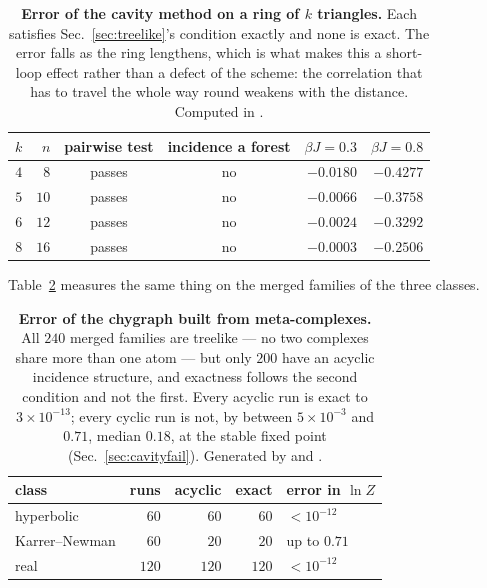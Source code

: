 \begin{table}[t]
\centering\small
\begin{tabular}{rrccrr}
\hline\hline
$k$ & $n$ & pairwise test & incidence a forest &
  $\beta J=0.3$ & $\beta J=0.8$\\
\hline
$4$ & $8$ & passes & no & $-0.0180$ & $-0.4277$\\
$5$ & $10$ & passes & no & $-0.0066$ & $-0.3758$\\
$6$ & $12$ & passes & no & $-0.0024$ & $-0.3292$\\
$8$ & $16$ & passes & no & $-0.0003$ & $-0.2506$\\
\hline\hline
\end{tabular}
\caption{\textbf{Error of the cavity method on a ring of $k$ triangles.} Each
satisfies Sec.~\ref{sec:treelike}'s condition exactly and none is exact. The
error falls as the ring lengthens, which is what makes this a short-loop effect
rather than a defect of the scheme: the correlation that has to travel the whole
way round weakens with the distance. Computed in
.}
\label{tab:ring}
\end{table}

Table~\ref{tab:mergeerr} measures the same thing on the merged families of the
three classes.

\begin{table}[t]
\centering\small
\begin{tabular}{lrrrl}
\hline\hline
class & runs & acyclic & exact & error in $\ln Z$\\
\hline
hyperbolic & $60$ & $60$ & $60$ & $<10^{-12}$\\
Karrer--Newman & $60$ & $20$ & $20$ & up to $0.71$\\
real & $120$ & $120$ & $120$ & $<10^{-12}$\\
\hline\hline
\end{tabular}
\caption{\textbf{Error of the chygraph built from meta-complexes.} All $240$
merged families are treelike --- no two complexes share more than one atom ---
but only $200$ have an acyclic incidence structure, and exactness follows the
second condition and not the first. Every acyclic run is exact to
$3\times10^{-13}$; every cyclic run is not, by between $5\times10^{-3}$ and
$0.71$, median $0.18$, at the stable fixed point (Sec.~\ref{sec:cavityfail}).
Generated by 
and .}
\label{tab:mergeerr}
\end{table}

